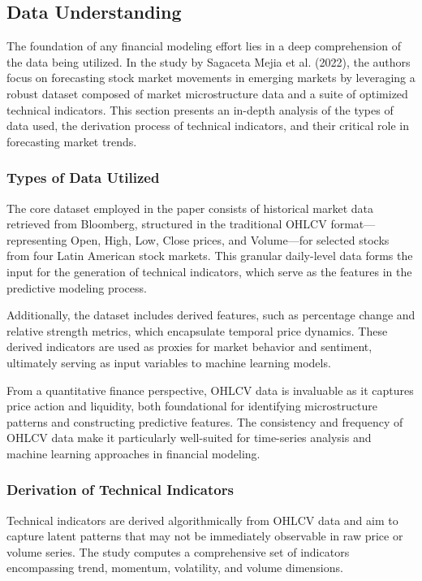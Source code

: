 \subsection{Data Understanding}

The foundation of any financial modeling effort lies in a deep comprehension of the data being utilized. In the study by Sagaceta Mejia et al. (2022), the authors focus on forecasting stock market movements in emerging markets by leveraging a robust dataset composed of market microstructure data and a suite of optimized technical indicators. This section presents an in-depth analysis of the types of data used, the derivation process of technical indicators, and their critical role in forecasting market trends.

\subsubsection{Types of Data Utilized}

The core dataset employed in the paper consists of historical market data retrieved from Bloomberg, structured in the traditional OHLCV format—representing Open, High, Low, Close prices, and Volume—for selected stocks from four Latin American stock markets. This granular daily-level data forms the input for the generation of technical indicators, which serve as the features in the predictive modeling process.

Additionally, the dataset includes derived features, such as percentage change and relative strength metrics, which encapsulate temporal price dynamics. These derived indicators are used as proxies for market behavior and sentiment, ultimately serving as input variables to machine learning models.

From a quantitative finance perspective, OHLCV data is invaluable as it captures price action and liquidity, both foundational for identifying microstructure patterns and constructing predictive features. The consistency and frequency of OHLCV data make it particularly well-suited for time-series analysis and machine learning approaches in financial modeling.

\subsubsection{Derivation of Technical Indicators}

Technical indicators are derived algorithmically from OHLCV data and aim to capture latent patterns that may not be immediately observable in raw price or volume series. The study computes a comprehensive set of indicators encompassing trend, momentum, volatility, and volume dimensions.

